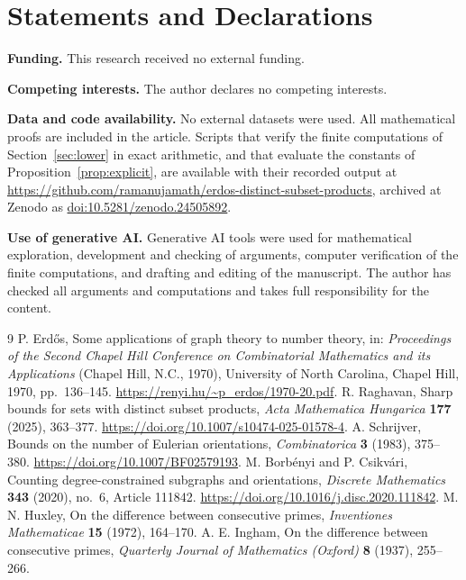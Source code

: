 \documentclass[11pt]{article}
\numberwithin{equation}{section}
\theoremstyle{remark}
\begin{document}
\section*{Statements and Declarations}
\noindent\textbf{Funding.} This research received no external funding.

\noindent\textbf{Competing interests.} The author declares no competing interests.

\noindent\textbf{Data and code availability.} No external datasets were used. All mathematical proofs are included in the article. Scripts that verify the finite computations of Section~\ref{sec:lower} in exact arithmetic, and that evaluate the constants of Proposition~\ref{prop:explicit}, are available with their recorded output at \url{https://github.com/ramanujamath/erdos-distinct-subset-products}, archived at Zenodo as \href{https://doi.org/10.5281/zenodo.24505892}{doi:10.5281/zenodo.24505892}.

\noindent\textbf{Use of generative AI.} Generative AI tools were used for mathematical exploration, development and checking of arguments, computer verification of the finite computations, and drafting and editing of the manuscript. The author has checked all arguments and computations and takes full responsibility for the content.

\begin{thebibliography}{9}
 P. Erd\H{o}s, Some applications of graph theory to number theory, in: \emph{Proceedings of the Second Chapel Hill Conference on Combinatorial Mathematics and its Applications} (Chapel Hill, N.C., 1970), University of North Carolina, Chapel Hill, 1970, pp.~136--145. \url{https://renyi.hu/~p_erdos/1970-20.pdf}.
 R. Raghavan, Sharp bounds for sets with distinct subset products, \emph{Acta Mathematica Hungarica} \textbf{177} (2025), 363--377. \url{https://doi.org/10.1007/s10474-025-01578-4}.
 A. Schrijver, Bounds on the number of Eulerian orientations, \emph{Combinatorica} \textbf{3} (1983), 375--380. \url{https://doi.org/10.1007/BF02579193}.
 M. Borb\'enyi and P. Csikv\'ari, Counting degree-constrained subgraphs and orientations, \emph{Discrete Mathematics} \textbf{343} (2020), no.~6, Article 111842. \url{https://doi.org/10.1016/j.disc.2020.111842}.
 M. N. Huxley, On the difference between consecutive primes, \emph{Inventiones Mathematicae} \textbf{15} (1972), 164--170.
 A. E. Ingham, On the difference between consecutive primes, \emph{Quarterly Journal of Mathematics (Oxford)} \textbf{8} (1937), 255--266.
\end{thebibliography}
\end{document}
